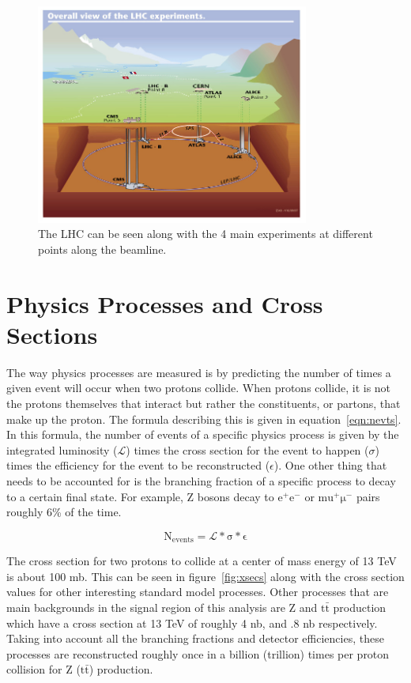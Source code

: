 \begin{figure}[!ht]
  \begin{center}
    \includegraphics[width=0.8\textwidth]{cms/figs/lhc-underground.jpeg}
    \caption{ The LHC can be seen along with the 4 main experiments at different points along the beamline.
      \label{fig:lhcunderground}
    }
  \end{center}
\end{figure}

\section{Physics Processes and Cross Sections}
The way physics processes are measured is by predicting the number of times a given event will occur when two protons collide.
When protons collide,
it is not the protons themselves that interact but rather the constituents, or partons, that make up the proton.
The formula describing this is given in equation~\ref{eqn:nevts}.
In this formula,
the number of events of a specific physics process is given by
the integrated luminosity ($\mathcal{L}$) times
the cross section for the event to happen ($\sigma$) times
the efficiency for the event to be reconstructed ($\epsilon$).
One other thing that needs to be accounted for is the branching fraction of a specific process to decay to a certain final state.
For example, Z bosons decay to $\mathrm{e^{+}e^{-}}$ or $\mathrm{mu^{+}\mu^{-}}$ pairs roughly 6\% of the time.

\begin{equation}
\label{eqn:nevts}
  \mathrm{N_{events} = \mathcal{L} * \sigma * \epsilon}
\end{equation}

The cross section for two protons to collide at a center of mass energy of 13 TeV is about 100 mb.
This can be seen in figure~\ref{fig:xsecs} along with the cross section values for other interesting
standard model processes.
Other processes that are main backgrounds in the signal region of this analysis are Z and $\mathrm{t\bar{t}}$ production
which have a cross section at 13 TeV of roughly 4 nb, and .8 nb respectively.
Taking into account all the branching fractions and detector efficiencies,
these processes are reconstructed roughly once in a billion (trillion) times per proton collision for Z ($\mathrm{t\bar{t}}$) production.

